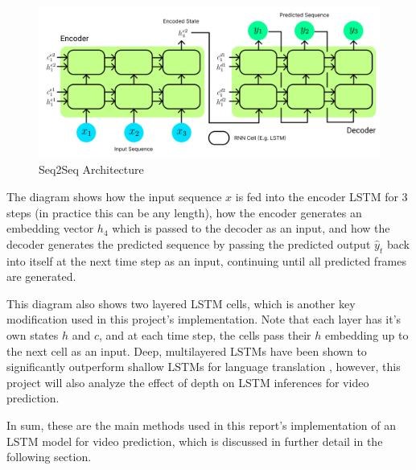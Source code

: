 \documentclass{scrartcl}
\begin{document}
\begin{figure}[H]
	\begin{center}
		\includegraphics[width=1\textwidth]{figures/seq2seq_arch.png}
	\end{center}
	\caption{Seq2Seq Architecture}
	\label{fig:seq2seq_arch}
\end{figure}

The diagram shows how the input sequence $x$ is fed into the encoder LSTM for 3
steps (in practice this can be any length), how the encoder generates an
embedding vector $h_4$ which is passed to the decoder as an input, and how the
decoder generates the predicted sequence by passing the predicted output
$\hat{y}_{t}$ back into itself at the next time step as an input, continuing
until all predicted frames are generated.

This diagram also shows two layered LSTM cells, which is another key
modification used in this project's implementation. Note that each layer has
it's own states $h$ and $c$, and at each time step, the cells pass their $h$
embedding up to the next cell as an input. Deep, multilayered LSTMs have been
shown to significantly outperform shallow LSTMs for language translation
\cite{seq2seq_original}, however, this project will also analyze the effect of
depth on LSTM inferences for video prediction. 

In sum, these are the main methods used in this report's implementation of an
LSTM model for video prediction, which is discussed in further detail in the
following section.
\end{document}
